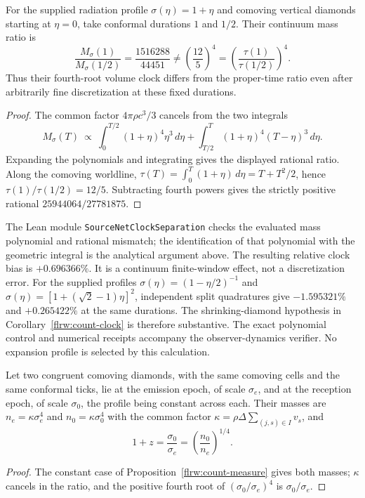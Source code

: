 \begin{proposition}
\label{flrw:finite-window-clock-counterexample}
For the supplied radiation profile $\sigma(\eta)=1+\eta$ and comoving
vertical diamonds starting at $\eta=0$, take conformal durations $1$ and
$1/2$. Their continuum mass ratio is
\[
 \frac{M_\sigma(1)}{M_\sigma(1/2)}=\frac{1516288}{44451}
 \ne\left(\frac{12}{5}\right)^4
 =\left(\frac{\tau(1)}{\tau(1/2)}\right)^4.
\]
Thus their fourth-root volume clock differs from the proper-time ratio
even after arbitrarily fine discretization at these fixed durations.
\end{proposition}
\begin{proof}
The common factor $4\pi\rho c^3/3$ cancels from the two integrals
\[
 M_\sigma(T)\ \propto\
 \int_0^{T/2}(1+\eta)^4\eta^3\,d\eta
 +\int_{T/2}^T(1+\eta)^4(T-\eta)^3\,d\eta.
\]
Expanding the polynomials and integrating gives the displayed rational
ratio. Along the comoving worldline,
$\tau(T)=\int_0^T(1+\eta)\,d\eta=T+T^2/2$, hence
$\tau(1)/\tau(1/2)=12/5$. Subtracting fourth powers gives the strictly
positive rational $25944064/27781875$.
\end{proof}
The Lean module \texttt{SourceNetClockSeparation} checks the evaluated
mass polynomial and rational mismatch; the identification of that
polynomial with the geometric integral is the analytical argument above.
The resulting relative clock bias is $+0.696366\%$. It is a continuum
finite-window effect, not a discretization error. For the supplied
profiles $\sigma(\eta)=(1-\eta/2)^{-1}$ and
$\sigma(\eta)=[1+(\sqrt2-1)\eta]^2$, independent split quadratures give
$-1.595321\%$ and $+0.265422\%$ at the same durations. The shrinking-diamond
hypothesis in Corollary~\ref{flrw:count-clock} is therefore substantive.
The exact polynomial control and numerical receipts accompany the
observer-dynamics verifier. No expansion profile is selected
by this calculation.

\begin{corollary}
\label{flrw:redshift}
Let two congruent comoving diamonds, with the same comoving cells and the
same conformal ticks, lie at the emission epoch, of scale $\sigma_e$, and
at the reception epoch, of scale $\sigma_0$, the profile being constant
across each. Their masses are $n_e=\kappa\sigma_e^4$ and
$n_0=\kappa\sigma_0^4$ with the common factor
$\kappa=\rho\Delta\sum_{(j,s)\in I}v_s$, and
\begin{equation}
 1+z=\frac{\sigma_0}{\sigma_e}=\left(\frac{n_0}{n_e}\right)^{1/4}.
 \label{flrw:eq-redshift}
\end{equation}
\end{corollary}
\begin{proof}
The constant case of Proposition~\ref{flrw:count-measure} gives both
masses; $\kappa$ cancels in the ratio, and the positive fourth root of
$(\sigma_0/\sigma_e)^4$ is $\sigma_0/\sigma_e$.
\end{proof}

